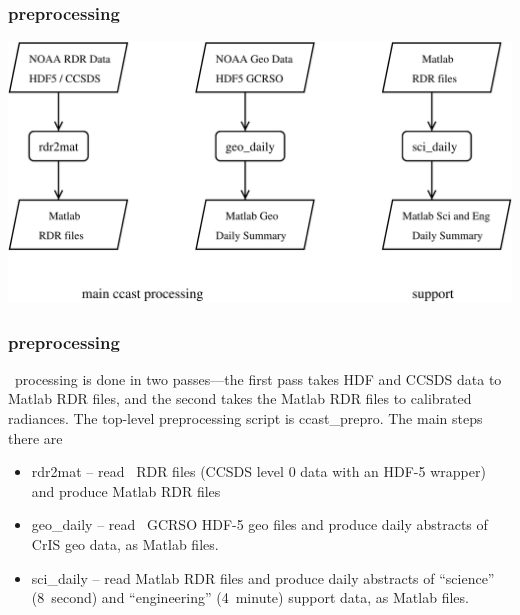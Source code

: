 \documentclass[11pt]{beamer}
\begin{document}
\begin{frame}
\frametitle{preprocessing}

\begin{center}
  \includegraphics[scale=0.4]{figures/prepro.pdf}
\end{center}

\end{frame}
\begin{frame}
\frametitle{preprocessing}

\ccast\ processing is done in two passes---the first pass takes HDF
and CCSDS data to Matlab RDR files, and the second takes the Matlab
RDR files to calibrated radiances.  The top-level preprocessing
script is ccast\_prepro.  The main steps there are

\begin{itemize}
  \item rdr2mat -- read \noaa\ RDR files (CCSDS level 0 data with an
    HDF-5 wrapper) and produce Matlab RDR files

  \item geo\_daily -- read \noaa\ GCRSO HDF-5 geo files and produce
    daily abstracts of CrIS geo data, as Matlab files.

  \item sci\_daily -- read Matlab RDR files and produce daily
    abstracts of ``science'' (8~second) and ``engineering''
    (4~minute) support data, as Matlab files.

\end{itemize}

\end{frame}
\end{document}
